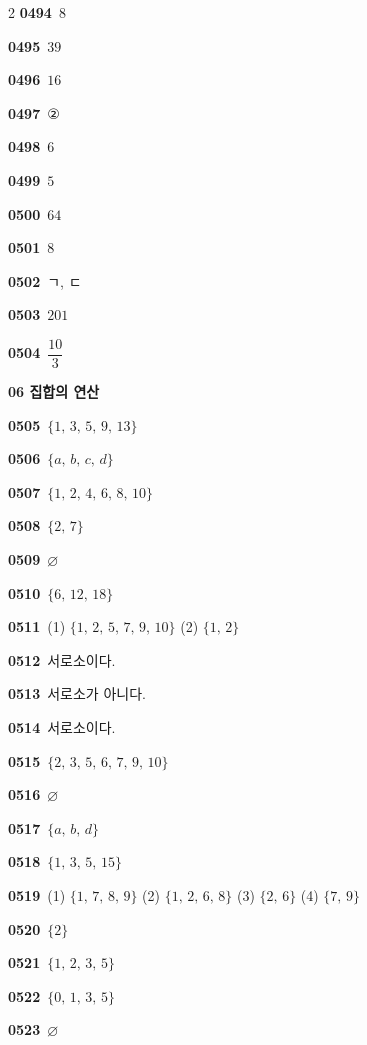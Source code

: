 \documentclass[10pt,a4paper]{article}
\begin{document}
\begin{multicols}{2}
\noindent\textbf{0494}\ $8$\par
\noindent\textbf{0495}\ $39$\par
\noindent\textbf{0496}\ $16$\par
\noindent\textbf{0497}\ ②\par
\noindent\textbf{0498}\ $6$\par
\noindent\textbf{0499}\ $5$\par
\noindent\textbf{0500}\ $64$\par
\noindent\textbf{0501}\ $8$\par
\noindent\textbf{0502}\ ㄱ, ㄷ\par
\noindent\textbf{0503}\ $201$\par
\noindent\textbf{0504}\ $\dfrac{10}{3}$\par
\noindent\textbf{06 집합의 연산}\par\smallskip
\noindent\textbf{0505}\ $\{1,\,3,\,5,\,9,\,13\}$\par
\noindent\textbf{0506}\ $\{a,\,b,\,c,\,d\}$\par
\noindent\textbf{0507}\ $\{1,\,2,\,4,\,6,\,8,\,10\}$\par
\noindent\textbf{0508}\ $\{2,\,7\}$\par
\noindent\textbf{0509}\ $\varnothing$\par
\noindent\textbf{0510}\ $\{6,\,12,\,18\}$\par
\noindent\textbf{0511}\ (1) $\{1,\,2,\,5,\,7,\,9,\,10\}$ (2) $\{1,\,2\}$\par
\noindent\textbf{0512}\ 서로소이다.\par
\noindent\textbf{0513}\ 서로소가 아니다.\par
\noindent\textbf{0514}\ 서로소이다.\par
\noindent\textbf{0515}\ $\{2,\,3,\,5,\,6,\,7,\,9,\,10\}$\par
\noindent\textbf{0516}\ $\varnothing$\par
\noindent\textbf{0517}\ $\{a,\,b,\,d\}$\par
\noindent\textbf{0518}\ $\{1,\,3,\,5,\,15\}$\par
\noindent\textbf{0519}\ (1) $\{1,\,7,\,8,\,9\}$ (2) $\{1,\,2,\,6,\,8\}$ (3) $\{2,\,6\}$ (4) $\{7,\,9\}$\par
\noindent\textbf{0520}\ $\{2\}$\par
\noindent\textbf{0521}\ $\{1,\,2,\,3,\,5\}$\par
\noindent\textbf{0522}\ $\{0,\,1,\,3,\,5\}$\par
\noindent\textbf{0523}\ $\varnothing$\par

\end{multicols}
\end{document}
